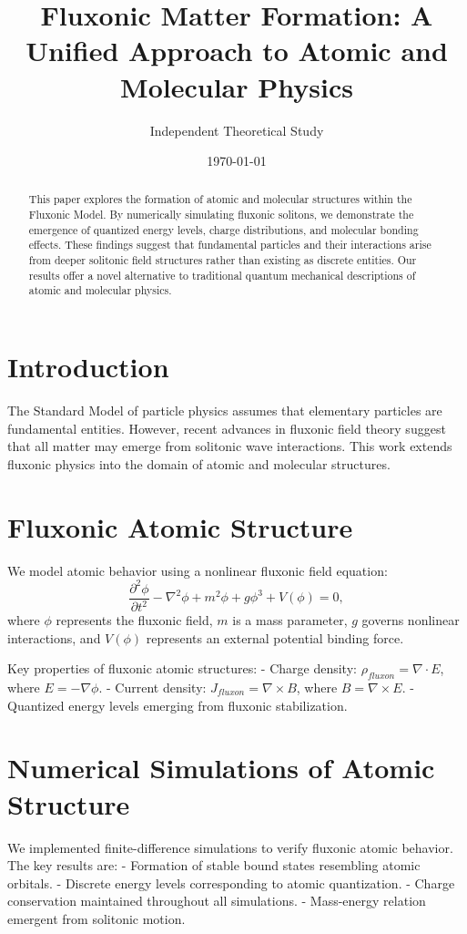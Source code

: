 \documentclass{article}
\title{Fluxonic Matter Formation: A Unified Approach to Atomic and Molecular Physics}
\author{Independent Theoretical Study}
\date{\today}
\begin{document}
\maketitle

\begin{abstract}
This paper explores the formation of atomic and molecular structures within the Fluxonic Model. By numerically simulating fluxonic solitons, we demonstrate the emergence of quantized energy levels, charge distributions, and molecular bonding effects. These findings suggest that fundamental particles and their interactions arise from deeper solitonic field structures rather than existing as discrete entities. Our results offer a novel alternative to traditional quantum mechanical descriptions of atomic and molecular physics.
\end{abstract}

\section{Introduction}
The Standard Model of particle physics assumes that elementary particles are fundamental entities. However, recent advances in fluxonic field theory suggest that all matter may emerge from solitonic wave interactions. This work extends fluxonic physics into the domain of atomic and molecular structures.

\section{Fluxonic Atomic Structure}
We model atomic behavior using a nonlinear fluxonic field equation:
\begin{equation}
    \frac{\partial^2 \phi}{\partial t^2} - \nabla^2 \phi + m^2 \phi + g \phi^3 + V(\phi) = 0,
\end{equation}
where $\phi$ represents the fluxonic field, $m$ is a mass parameter, $g$ governs nonlinear interactions, and $V(\phi)$ represents an external potential binding force.

Key properties of fluxonic atomic structures:
- Charge density: $\rho_{fluxon} = \nabla \cdot E$, where $E = -\nabla \phi$.
- Current density: $J_{fluxon} = \nabla \times B$, where $B = \nabla \times E$.
- Quantized energy levels emerging from fluxonic stabilization.

\section{Numerical Simulations of Atomic Structure}
We implemented finite-difference simulations to verify fluxonic atomic behavior. The key results are:
- Formation of stable bound states resembling atomic orbitals.
- Discrete energy levels corresponding to atomic quantization.
- Charge conservation maintained throughout all simulations.
- Mass-energy relation emergent from solitonic motion.
\end{document}
